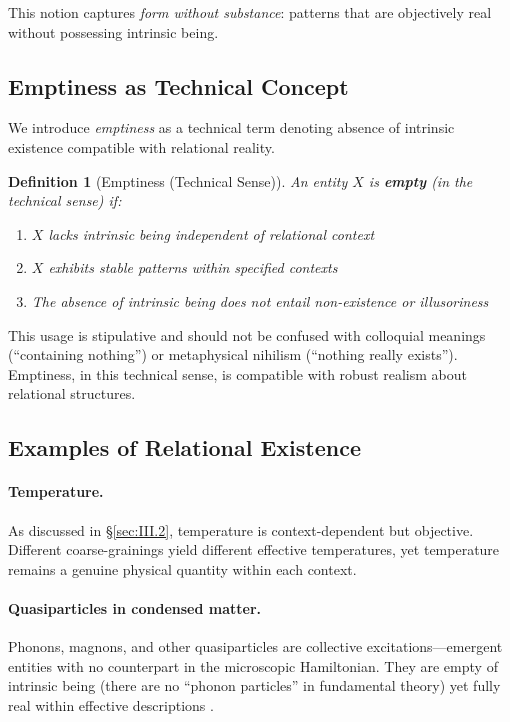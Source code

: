\documentclass[11pt,a4paper]{article}
\newtheorem{definition}{Definition}[section]
\begin{document}
This notion captures \emph{form without substance}: patterns that are objectively real without possessing intrinsic being.

\subsection{Emptiness as Technical Concept}
\label{sec:III.3}

We introduce \emph{emptiness} as a technical term denoting absence of intrinsic existence compatible with relational reality.

\begin{definition}[Emptiness (Technical Sense)]
\label{def:emptiness-technical}
An entity $X$ is \textbf{empty} (in the technical sense) if:
\begin{enumerate}
\item $X$ lacks intrinsic being independent of relational context
\item $X$ exhibits stable patterns within specified contexts
\item The absence of intrinsic being does not entail non-existence or illusoriness
\end{enumerate}
\end{definition}

This usage is stipulative and should not be confused with colloquial meanings (``containing nothing'') or metaphysical nihilism (``nothing really exists''). Emptiness, in this technical sense, is compatible with robust realism about relational structures.

\subsection{Examples of Relational Existence}
\label{sec:III.4}

\paragraph{Temperature.}
As discussed in \S\ref{sec:III.2}, temperature is context-dependent but objective. Different coarse-grainings yield different effective temperatures, yet temperature remains a genuine physical quantity within each context.

\paragraph{Quasiparticles in condensed matter.}
Phonons, magnons, and other quasiparticles are collective excitations—emergent entities with no counterpart in the microscopic Hamiltonian. They are empty of intrinsic being (there are no ``phonon particles'' in fundamental theory) yet fully real within effective descriptions \cite{Ladyman2007}.
\end{document}
